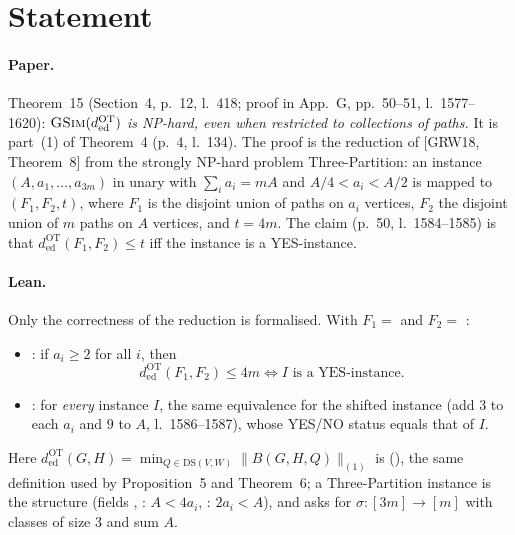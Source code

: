 

\paperversion

\section{Statement}

\paragraph{Paper.} Theorem~15 (Section~4, p.~12, l.~418; proof in App.~G, pp.~50--51, l.~1577--1620):
\emph{$\textsc{GSim}(d^{\mathrm{OT}}_{\mathrm{ed}})$ is NP-hard, even when restricted to collections of paths.}
It is part~(1) of Theorem~4 (p.~4, l.~134). The proof is the reduction of [GRW18, Theorem~8] from the strongly
NP-hard problem Three-Partition: an instance $(A,a_1,\dots,a_{3m})$ in unary with $\sum_i a_i=mA$ and
$A/4<a_i<A/2$ is mapped to $(F_1,F_2,t)$, where $F_1$ is the disjoint union of paths on $a_i$ vertices,
$F_2$ the disjoint union of $m$ paths on $A$ vertices, and $t=4m$. The claim (p.~50, l.~1584--1585) is that
$d^{\mathrm{OT}}_{\mathrm{ed}}(F_1,F_2)\le t$ iff the instance is a YES-instance.

\paragraph{Lean.} Only the correctness of the reduction is formalised. With
$F_1=$  and $F_2=$ :
\begin{itemize}
\item {}: if $a_i\ge2$ for all $i$, then
  \[ d^{\mathrm{OT}}_{\mathrm{ed}}(F_1,F_2)\le 4m \iff I \text{ is a YES-instance.} \]
\item {}: for \emph{every} instance $I$, the same
  equivalence for the shifted instance (add $3$ to each $a_i$ and $9$ to $A$, l.~1586--1587), whose
  YES/NO status equals that of $I$.
\end{itemize}
Here $d^{\mathrm{OT}}_{\mathrm{ed}}(G,H)=\min_{Q\in\mathrm{DS}(V,W)}\|B(G,H,Q)\|_{(1)}$ is 
(), the same definition used by Proposition~5 and Theorem~6; a
Three-Partition instance is the structure  (fields ,
: $A<4a_i$, : $2a_i<A$), and  asks for
$\sigma\colon[3m]\to[m]$ with classes of size $3$ and sum $A$.

